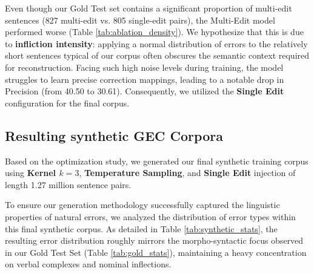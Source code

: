 \documentclass[11pt]{article}
\begin{document}
Even though our Gold Test set contains a significant proportion of multi-edit sentences (827 multi-edit vs. 805 single-edit pairs), the Multi-Edit model performed worse (Table \ref{tab:ablation_density}). We hypothesize that this is due to \textbf{infliction intensity}: applying a normal distribution of errors to the relatively short sentences typical of our corpus often obscures the semantic context required for reconstruction. Facing such high noise levels during training, the model struggles to learn precise correction mappings, leading to a notable drop in Precision (from 40.50 to 30.61). Consequently, we utilized the \textbf{Single Edit} configuration for the final corpus.

\subsection{Resulting synthetic GEC Corpora}
\label{sec:Datasets}

Based on the optimization study, we generated our final synthetic training corpus using \textbf{Kernel $k=3$}, \textbf{Temperature Sampling}, and \textbf{Single Edit} injection of length 1.27 million sentence pairs. 

To ensure our generation methodology successfully captured the linguistic properties of natural errors, we analyzed the distribution of error types within this final synthetic corpus. As detailed in Table \ref{tab:synthetic_stats}, the resulting error distribution roughly mirrors the morpho-syntactic focus observed in our Gold Test Set (Table \ref{tab:gold_stats}), maintaining a heavy concentration on verbal complexes and nominal inflections.

\begin{table}[h]
\centering
\small
{}
\caption{Distribution of error types in the final 1.27M Synthetic Training Corpus. The distribution roughly mirrors the gold set's morpho-syntactic focus.}
\label{tab:synthetic_stats}
\end{table}
\end{document}
